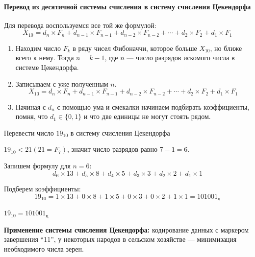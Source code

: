 \paragraph{Перевод из десятичной системы счисления в систему счисления Цекендорфа}\label{par:decimal-to-zeckendorfs}

Для перевода воспользуемся все той же формулой:
\[
    X_{10} = d_{n} \times F_{n} + d_{n-1} \times F_{n-1} + d_{n-2} \times F_{n-2} + \cdots + d_{2} \times F_{2} + d_{1} \times F_{1}
\]

\begin{enumerate}
    \item Находим число $F_{k}$ в ряду чисел Фибоначчи, которое больше $X_{10}$, но ближе всего к нему. Тогда $n = k - 1$, где $n$ --- число разрядов искомого числа в системе Цекендорфа.
    \item Записываем с уже полученным $n$.
        \[
            X_{10} = d_{n} \times F_{n} + d_{n-1} \times F_{n-1} + d_{n-2} \times F_{n-2} + \cdots + d_{2}\times F_{2} + d_{1} \times F_{1}
        \]
    \item Начиная с $d_{n}$ с помощью ума и смекалки начинаем подбирать коэффициенты, помня, что $d_{1} \in \{0,1\}$ и что две единицы не могут стоять рядом.
\end{enumerate}

\begin{example}
    \task%
    Перевести число $19_{10}$ в систему счисления Цекендорфа

    \solution%
    $19_{10} < 21 (21 = F_{7})$, значит число разрядов равно $7 - 1 = 6$.

    Запишем формулу для $n = 6$:
    \[
        d_{6}\times 13 + d_{5}\times 8 + d_{4}\times 5 + d_{3}\times 3 + d_{2}\times 2 + d_{1}\times 1
    \]

    Подберем коэффициенты:
    \[
        19_{10} = 1 \times 13 + 0 \times 8 + 1 \times 5 + 0 \times 3 + 0 \times 2 + 1\times 1 \allowbreak = 101001_{\text{ц}}
    \]

    \answer%
    $19_{10} = 101001_{\text{ц}}$
\end{example}

\textbf{Применение системы счисления Цекендорфа:} кодирование данных с маркером завершения \enquote{11}, у некоторых народов в сельском хозяйстве --- минимизация необходимого числа зерен.
